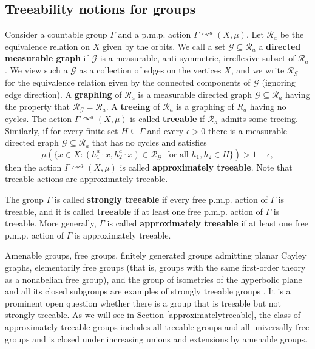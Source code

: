 \documentclass[12pt]{amsart}
\theoremstyle{definition}
\def\cal{\mathcal}
\newcommand{\pmp}{p{$.$}m{$.$}p{$.$}}
\newcommand{\acts}{\curvearrowright}
\begin{document}
\subsection{Treeability notions for groups}\label{treeabletypes}
Consider a countable group $\Gamma$ and a {\pmp} action $\Gamma \acts^a (X, \mu)$. Let $\mathcal R_a$ be the equivalence relation on $X$ given by the orbits. We call a set $\cal G \subseteq \cal R_a$ a {\bf directed measurable graph} if $\cal G$ is a measurable, anti-symmetric, irreflexive subset of $\cal R_a$. We view such a $\cal G$ as a collection of edges on the vertices $X$, and we write $\cal R_\cal G$ for the equivalence relation given by the connected components of $\cal G$ (ignoring edge direction). A {\bf graphing} of $\cal R_a$ is a measurable directed graph $\cal G \subseteq \cal R_a$ having the property that $\cal R_\cal G = \cal R_a$. A {\bf treeing} of $\cal R_a$ is a graphing of $R_a$ having no cycles. The action $\Gamma \acts^a (X, \mu)$ is called {\bf treeable} if $\cal R_a$ admits some treeing. Similarly, if for every finite set $H \subseteq \Gamma$ and every $\epsilon > 0$ there is a measurable directed graph $\cal G \subseteq \cal R_a$ that has no cycles and satisfies
$$\mu(\{x \in X : (h_1^a \cdot x, h_2^a \cdot x) \in \cal R_{\cal G}\ \text{ for all }h_1,h_2\in H\}) > 1 - \epsilon,$$
then the action $\Gamma \acts^a (X, \mu)$ is called {\bf approximately treeable}. Note that treeable actions are approximately treeable.

The group $\Gamma$ is called {\bf strongly treeable} if every free {\pmp} action of $\Gamma$ is treeable, and it is called {\bf treeable} if at least one free {\pmp} action of $\Gamma$ is treeable. More generally, $\Gamma$ is called {\bf approximately treeable} if at least one free {\pmp} action of $\Gamma$ is approximately treeable.

Amenable groups, free groups, finitely generated groups admitting planar Cayley graphs, elementarily free groups (that is, groups with the same first-order theory as a nonabelian free group), and the group of isometries of the hyperbolic plane and all its closed subgroups are examples of strongly treeable groups \cite{CGMTD,Gab}. It is a prominent open question whether there is a group that is treeable but not strongly treeable. As we will see in Section \ref{approximatelytreeable}, the class of approximately treeable groups includes all treeable groups and all universally free groups and is closed under increasing unions and extensions by amenable groups.
\end{document}
